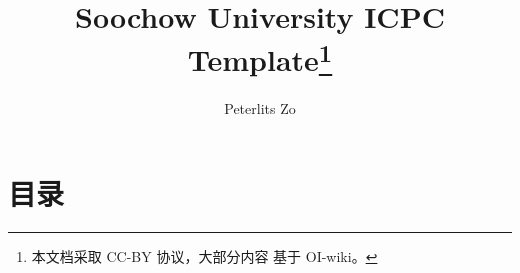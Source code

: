 \documentclass[a4paper, 9pt]{ctexbook}
\title{Soochow University ICPC Template\thanks{本文档采取 CC-BY 协议，大部分内容
基于 OI-wiki。}}
\author{Peterlits Zo}
\begin{document}
\maketitle

\twocolumn
\chapter*{目录}
\tableofcontents
\newpage















\end{document}
